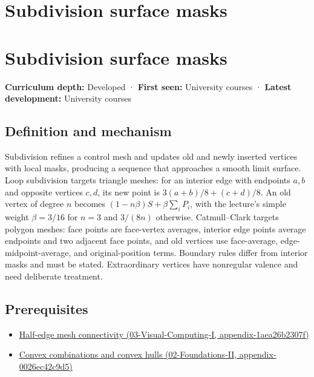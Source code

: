 \hypertarget{appendix-0234ab7f86b1}{}
\section*{Subdivision surface masks}
\section{Subdivision surface masks}\label{appendix-0234ab7f86b1-subdivision-surface-masks}

\textbf{Curriculum depth:} Developed · \textbf{First seen:} University courses · \textbf{Latest development:} University courses

\subsection{Definition and mechanism}\label{appendix-0234ab7f86b1-definition-and-mechanism}

Subdivision refines a control mesh and updates old and newly inserted vertices with local masks, producing a sequence that approaches a smooth limit surface. Loop subdivision targets triangle meshes: for an interior edge with endpoints \(a,b\) and opposite vertices \(c,d\), its new point is \(3(a+b)/8+(c+d)/8\). An old vertex of degree \(n\) becomes \((1-n\beta)S+\beta\sum_iP_i\), with the lecture's simple weight \(\beta=3/16\) for \(n=3\) and \(3/(8n)\) otherwise. Catmull--Clark targets polygon meshes: face points are face-vertex averages, interior edge points average endpoints and two adjacent face points, and old vertices use face-average, edge-midpoint-average, and original-position terms. Boundary rules differ from interior masks and must be stated. Extraordinary vertices have nonregular valence and need deliberate treatment.

\subsection{Prerequisites}\label{appendix-0234ab7f86b1-prerequisites}

\begin{itemize}
\tightlist
\item
  \href{../03-Visual-Computing-I/main.pdf\#nameddest=appendix-1aea26b2307f}{Half-edge mesh connectivity (03-Visual-Computing-I, appendix-1aea26b2307f)}
\item
  \href{../02-Foundations-II/main.pdf\#nameddest=appendix-0026ec42c9d5}{Convex combinations and convex hulls (02-Foundations-II, appendix-0026ec42c9d5)}
\end{itemize}

